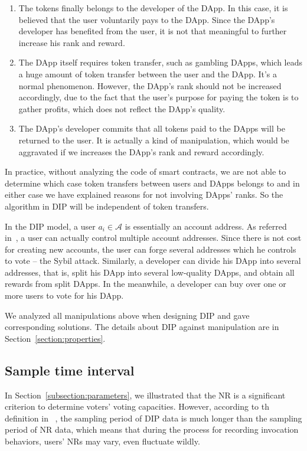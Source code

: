   \begin{enumerate}
  	 \item The tokens finally belongs to the developer of the DApp. In this case, it is believed that the user voluntarily pays to the DApp. Since the DApp's developer has benefited from the user, it is not that meaningful to further increase his rank and reward. 
  	\item The DApp itself requires token transfer, such as gambling DApps, which leads  a huge amount of token transfer between the user and the DApp. It's a normal phenomenon. However, the DApp's rank should not be increased accordingly, due to the fact that the user's purpose for paying the token is to gather profits, which does not reflect the DApp's quality.  
   \item The DApp's developer commits that all tokens paid to the DApps will be returned to the user. It is actually a kind of manipulation, which would be aggravated if we increases the DApp's rank and reward accordingly.  
  \end{enumerate}
  In practice, without analyzing the code of smart contracts, we are not able to determine which case token transfers between users and DApps belongs to and in either case we have explained reasons for not involving DApps' ranks. So the algorithm in DIP will be independent of token transfers. 
  
  In the DIP model, a user $a_i \in \mathcal{A}$ is essentially an account address. As referred in~\cite{Nebulasyellowpaper}, a user can actually control multiple account addresses. Since there is not cost for creating new accounts, the user can forge several addresses which he controls to vote -- the Sybil attack. Similarly, a developer can divide his DApp into several addresses, that is, split his DApp into several low-quality DApps, and obtain all rewards from split DApps. In the meanwhile, a developer can buy over one or more users to vote for his DApp. 
  
  We analyzed all manipulations above when designing DIP and gave corresponding solutions. The details about DIP against manipulation are in Section~\ref{section:properties}.
  
  \subsection{Sample time interval}
  \label{subsection:interval}
  In Section~\ref{subsection:parameters}, we illustrated that the NR is a significant criterion to determine voters' voting capacities. However, according to th definition in ~\cite{Nebulasyellowpaper}, the sampling period of DIP data is much longer than the sampling period of NR data, which means that during the process for recording invocation behaviors, users' NRs may vary, even fluctuate wildly.
  
